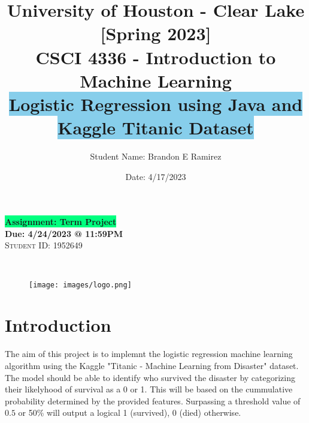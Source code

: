 \documentclass[notitlepage,a4paper,oneside,article,table]{article}
\title{University of Houston - Clear Lake [Spring 2023] \\
CSCI 4336 - Introduction to Machine Learning\\
\colorbox{SkyBlue}{Logistic Regression using Java and Kaggle Titanic Dataset}}
\author{Student Name: Brandon E Ramirez}
\date{Date: 4/17/2023}
\begin{document}
\pagestyle{fancy}

\fancyhead{}\fancyfoot{}









\maketitle
\begin{center}
       \textbf{\colorbox{SpringGreen}{Assignment: Term Project}}\\   
       \vspace{0.2cm}
       \textbf{Due: 4/24/2023 @ 11:59PM}
       \vspace{0.2cm}\\
       \textsc{Student ID: 1952649}

\vspace{0.2cm}\\

\begin{figure}[h] %
    \centering
    \texttt{[image: images/logo.png]}
\end{figure}
\FloatBarrier
       \newpage %
   \end{center}
\small \tableofcontents
\listoffigures
\vspace{1cm}


\section{Introduction}
The aim of this project is to implemnt the logistic regression machine learning algorithm using 
the Kaggle "Titanic - Machine Learning from Disaster" dataset. The model should be able to identify 
who survived the disaster by categorizing their likelyhood of survival as a 0 or 1. This will be based on the cummulative probability determined by the provided features. Surpassing a threshold value of $0.5$ or 50\% will output a logical 1 (survived), 0 (died) otherwise. 
\end{document}
